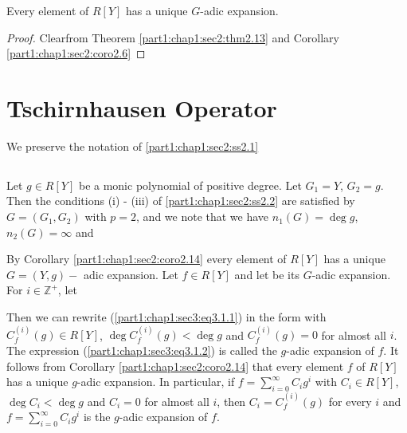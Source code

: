 \begin{coro}\label{part1:chap1:sec2:coro2.14}
Every element of $R[Y]$ has a unique $G$-adic expansion.
\end{coro}

\begin{proof}
  Clear\pageoriginale from Theorem \ref{part1:chap1:sec2:thm2.13} and Corollary \ref{part1:chap1:sec2:coro2.6}
\end{proof}

\section{Tschirnhausen Operator}\label{part1:chap1:sec3}

We preserve the notation of \ref{part1:chap1:sec2:ss2.1}

\subsection{}

Let $g \in R [Y]$ be a monic polynomial of positive degree. Let $G_1 = Y$, $G_2 =g$. Then the conditions (i) - (iii) of \ref{part1:chap1:sec2:ss2.2} are satisfied by $G= (G_1 , G_2)$ with $p=2$, and we note that we have $n_1 (G) =\deg g$, $n_2 (G)= \infty$ and 

By Corollary \ref{part1:chap1:sec2:coro2.14} every element of $R[Y]$ has a unique $G = (Y, g)-$ adic expansion. Let $f \in R [Y]$ and let
be its $G$-adic expansion. For $i \in \mathbb{Z}^+$, let

Then we can rewrite (\ref{part1:chap1:sec3:eq3.1.1}) in the form
with $C_f^{(i)}(g) \in R[Y]$, $\deg C_f^{(i)} (g)< \deg g$ and $C_f^{(i)}(g)=0$ for almost all $i$. The expression (\ref{part1:chap1:sec3:eq3.1.2}) is called the $g$-adic expansion of $f$. It follows from Corollary \ref{part1:chap1:sec2:coro2.14} that every element $f$ of $R[Y]$ has a unique $g$-adic expansion. In particular, if $f = \displaystyle{\sum^\infty_{i=0}} C_i g^i$ with $C_i \in R[Y]$, $\deg C_i < \deg g$ and $C_i=0$ for almost all $i$, then $C_i = C_f^{(i)} (g)$ for every $i$ and $f = \displaystyle{\sum^\infty_{i=0}} C_i g^i$ is the $g$-adic expansion of $f$. 
 
